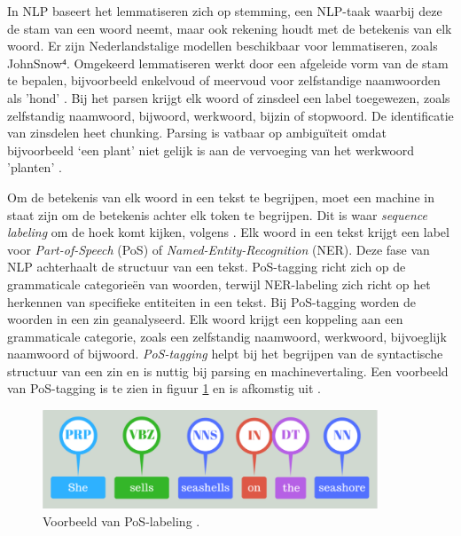 In NLP baseert het lemmatiseren zich op stemming, een NLP-taak waarbij deze de stam van een woord neemt, maar ook rekening houdt met de betekenis van elk woord. Er zijn Nederlandstalige modellen beschikbaar voor lemmatiseren, zoals JohnSnow⁴. Omgekeerd lemmatiseren werkt door een afgeleide vorm van de stam te bepalen, bijvoorbeeld enkelvoud of meervoud voor zelfstandige naamwoorden als ’hond’ \autocite{Eisenstein2019}. Bij het parsen krijgt elk woord of zinsdeel een label toegewezen, zoals zelfstandig naamwoord, bijwoord, werkwoord, bijzin of stopwoord. De identificatie van zinsdelen heet chunking. Parsing is vatbaar op ambiguïteit omdat bijvoorbeeld ‘een plant’ niet gelijk is aan de vervoeging van het werkwoord ’planten’ \autocite{Eisenstein2019}.

\medspace

Om de betekenis van elk woord in een tekst te begrijpen, moet een machine in staat zijn om de betekenis achter elk token te begrijpen. Dit is waar \textit{sequence labeling} om de hoek komt kijken, volgens \textcite{Eisenstein2019}. Elk woord in een tekst krijgt een label voor \textit{Part-of-Speech} (PoS) of \textit{Named-Entity-Recognition} (NER). Deze fase van NLP achterhaalt de structuur van een tekst. PoS-tagging richt zich op de grammaticale categorieën van woorden, terwijl NER-labeling zich richt op het herkennen van specifieke entiteiten in een tekst. Bij PoS-tagging worden de woorden in een zin geanalyseerd. Elk woord krijgt een koppeling aan een grammaticale categorie, zoals een zelfstandig naamwoord, werkwoord, bijvoeglijk naamwoord of bijwoord. \textit{PoS-tagging} helpt bij het begrijpen van de syntactische structuur van een zin en is nuttig bij parsing en machinevertaling. Een voorbeeld van PoS-tagging is te zien in figuur \ref{fig:pos-labeling} en is afkomstig uit \textcite{Bilisci2021}.

\begin{center}
	\begin{figure}[H]
		\includegraphics[width=10cm]{img/poslabeling.png}
		\caption{Voorbeeld van PoS-labeling \autocite{Bilisci2021}.}
		\label{fig:pos-labeling}
	\end{figure}
\end{center}

